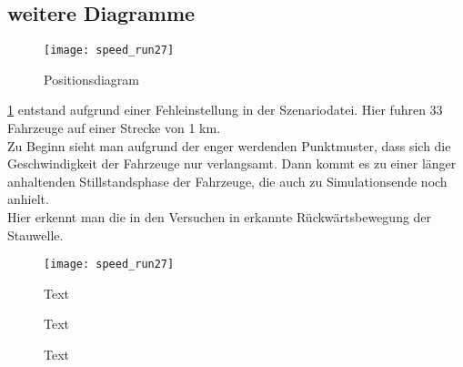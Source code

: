 \newpage

\subsection{weitere Diagramme}


\begin{figure}[hptb]
 \centering
 \texttt{[image: speed\_run27]}
 \caption[kurzText]
 		{Positionsdiagram}
 \label{figure:33veh-1km}
\end{figure}

\cref{figure:33veh-1km} entstand aufgrund einer Fehleinstellung in der Szenariodatei.
Hier fuhren 33 Fahrzeuge auf einer Strecke von 1 km.
\\
Zu Beginn sieht man aufgrund der enger werdenden Punktmuster, dass sich die Geschwindigkeit der Fahrzeuge nur verlangsamt. Dann kommt es zu einer länger anhaltenden Stillstandsphase der Fahrzeuge, die auch zu Simulationsende noch anhielt.
\\
Hier erkennt man die in den Versuchen in \cite{na-sch} erkannte Rückwärtsbewegung der Stauwelle.










\begin{figure}[hptb]
 \centering
 \texttt{[image: speed\_run27]}
 \caption[kurzText]
 		{Text}
 \label{figure:image1}
\end{figure}


\begin{figure}[hptb]
  \centering 
   \qquad 
     \caption{Text} 
  \label{figure:image2}
\end{figure}


\begin{figure}[hptb]
  \centering 
   \qquad 
   \qquad 
  \caption{Text} 
  \label{figure:image3}
\end{figure}

